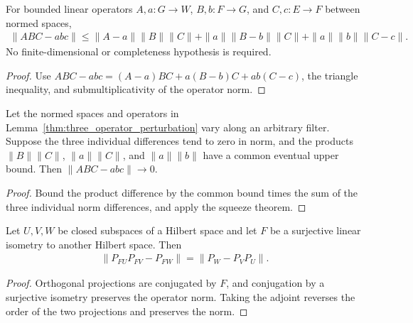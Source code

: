 \begin{lemma}
    \label{thm:three_operator_perturbation}
    \leanok
    For bounded linear operators $A,a:G\to W$, $B,b:F\to G$, and
    $C,c:E\to F$ between normed spaces,
    \begin{align}
        \|ABC-abc\|\le
        \|A-a\|\|B\|\|C\|+
        \|a\|\|B-b\|\|C\|+
        \|a\|\|b\|\|C-c\|.
    \end{align}
    No finite-dimensional or completeness hypothesis is required.
\end{lemma}
\begin{proof}\leanok
    Use $ABC-abc=(A-a)BC+a(B-b)C+ab(C-c)$, the triangle inequality,
    and submultiplicativity of the operator norm.
\end{proof}

\begin{lemma}
    \label{thm:three_operator_perturbation_limit}
    \leanok
    Let the normed spaces and operators in Lemma~\ref{thm:three_operator_perturbation}
    vary along an arbitrary filter. Suppose the three individual differences
    tend to zero in norm, and the products $\|B\|\|C\|$, $\|a\|\|C\|$,
    and $\|a\|\|b\|$ have a common eventual upper bound.
    Then $\|ABC-abc\|\to0$.
\end{lemma}
\begin{proof}\leanok
    Bound the product difference by the common bound times the sum of the
    three individual norm differences, and apply the squeeze theorem.
\end{proof}

\begin{lemma}
    \label{thm:isometric_projection_defect_transport}
    \leanok
    Let $U,V,W$ be closed subspaces of a Hilbert space and let $F$ be a
    surjective linear isometry to another Hilbert space. Then
    \begin{align}
        \|P_{FU}P_{FV}-P_{FW}\|=\|P_W-P_VP_U\|.
    \end{align}
\end{lemma}
\begin{proof}\leanok
    Orthogonal projections are conjugated by $F$, and conjugation by a
    surjective isometry preserves the operator norm. Taking the adjoint
    reverses the order of the two projections and preserves the norm.
\end{proof}

